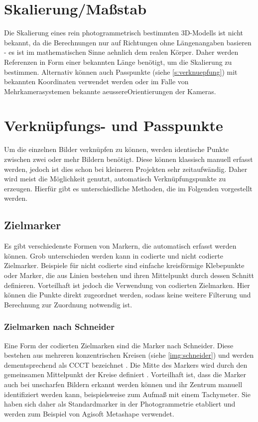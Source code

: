 \documentclass[./00PhotoBox.tex]{subfiles}
\begin{document}
\section{Skalierung/Maßstab}
\label{sec:massstab}
Die Skalierung eines rein photogrammetrisch bestimmten 3D-Modells ist nicht bekannt, da die Berechnungen nur auf Richtungen ohne Längenangaben basieren - es ist im mathematischen Sinne \gls{aehnlich} dem realen Körper. Daher werden Referenzen in Form einer bekannten Länge benötigt, um die Skalierung zu bestimmen. Alternativ können auch Passpunkte (siehe \autoref{s:verknuepfung}) mit bekannten Koordinaten verwendet werden oder im Falle von Mehrkamerasystemen bekannte \gls{aeussereOrientierung}en der Kameras. \citep[vgl.][S. 546]{luhmann}


\section{Verknüpfungs- und Passpunkte}
\label{s:verknuepfung}
Um die einzelnen Bilder verknüpfen zu können, werden identische Punkte zwischen zwei oder mehr Bildern benötigt. Diese können klassisch manuell erfasst werden, jedoch ist dies schon bei kleineren Projekten sehr zeitaufwändig. Daher wird meist die Möglichkeit genutzt, au\-to\-ma\-tisch Verknüpfungspunkte zu erzeugen. Hierfür gibt es unterschiedliche Methoden, die im Folgenden vorgestellt werden.


\subsection{Zielmarker}
Es gibt verschiedenste Formen von Markern, die au\-to\-ma\-tisch erfasst werden können. Grob unterschieden werden kann in codierte und nicht codierte Zielmarker. Beispiele für nicht codierte sind einfache kreisförmige Klebepunkte oder Marker, die aus Linien bestehen und ihren Mittelpunkt durch dessen Schnitt definieren.
Vorteilhaft ist jedoch die Verwendung von codierten Zielmarken. Hier können die Punkte direkt zugeordnet werden, sodass keine weitere Filterung und Berechnung zur Zuordnung notwendig ist. \citep[vgl.][S. 535ff]{luhmann}

\subsubsection{Zielmarken nach Schneider}
Eine Form der codierten Zielmarken sind die Marker nach Schneider. Diese bestehen aus mehreren konzentrischen Kreisen (siehe \autoref{img:schneider}) und werden dementsprechend als \Gls{CCCT} bezeichnet \citep[vgl.][]{ccct}. Die Mitte des Markers wird durch den gemeinsamen Mittelpunkt der Kreise definiert \citep[vgl.][]{schneider}. Vorteilhaft ist, dass die Marker auch bei unscharfen Bildern erkannt werden können und ihr Zentrum manuell identifiziert werden kann, beispielsweise zum Aufmaß mit einem Tachymeter. Sie haben sich daher als Standardmarker in der Photogrammetrie etabliert und werden zum Beispiel von Agisoft Metashape verwendet.
\end{document}
